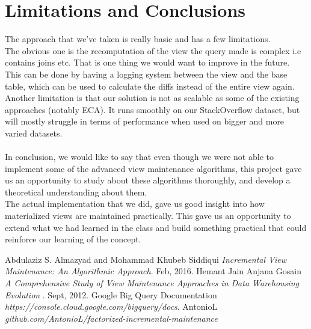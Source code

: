 \documentclass[12pt]{report}
\begin{document}
\section{Limitations and Conclusions}
The approach that we've taken is really basic and has a few limitations.
\\The obvious one is the recomputation of the view the query made is complex i.e contains joins etc. That is one thing we would want to improve in the future. This can be done by having a logging system between the view and the base table, which can be used to calculate the diffs instead of the entire view again.
Another limitation is that our solution is not as scalable as some of the existing approaches (notably ECA). It runs smoothly on our StackOverflow dataset, but will mostly struggle in terms of performance when used on bigger and more varied datasets.
\\\\In conclusion, we would like to say that even though we were not able to implement some of the advanced view maintenance algorithms, this project gave us an opportunity to study about these algorithms thoroughly, and develop a theoretical understanding about them.
\\The actual implementation that we did, gave us good insight into how materialized views are maintained practically. This gave us an opportunity to extend what we had learned in the class and build something practical that could reinforce our learning of the concept.
\begin{thebibliography}{999}
Abdulaziz S. Almazyad and Mohammad Khubeb Siddiqui\emph{ Incremental View Maintenance: An Algorithmic 
Approach}.
 	 Feb, 2016.
Hemant Jain Anjana Gosain \emph{A Comprehensive Study of View Maintenance Approaches in Data Warehousing Evolution }.
 	 Sept, 2012. 	 
Google Big Query Documentation \emph{https://console.cloud.google.com/bigquery/docs}.
AntonioL \emph{github.com/AntonioL/factorized-incremental-maintenance}
\end{thebibliography}
\end{document}
